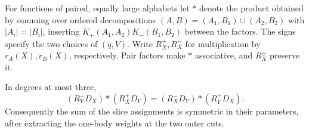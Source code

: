For functions of paired, equally large alphabets let $*$ denote the
product obtained by summing over ordered decompositions
$(A,B)=(A_1,B_1)\sqcup(A_2,B_2)$ with $|A_i|=|B_i|$, inserting
$K_+(A_1,A_2)K_-(B_1,B_2)$ between the factors. The signs specify the
two choices of $(q,V)$. Write $R_X^+,R_X^-$ for multiplication by
$r_A(X),r_B(X)$, respectively. Pair factors make $*$ associative,
and $R_X^\pm$ preserve it.
\begin{lemma}\label{lem:cubic-slices}
In degrees at most three,
\begin{equation}\label{eq:cubic-commute}
 (R_Y^-D_X)*(R_X^+D_Y)=(R_X^-D_Y)*(R_Y^+D_X).
\end{equation}
Consequently the sum of the slice assignments is symmetric in their
parameters, after extracting the one-body weights at the two outer cuts.
\end{lemma}

